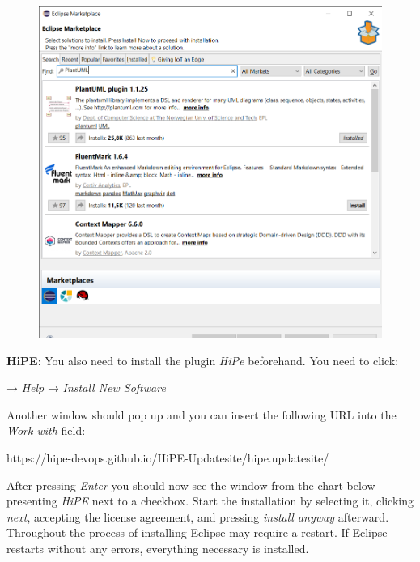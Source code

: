 \begin{figure}[h]
    \centering
    \includegraphics[scale = 0.4]{pictures/Eclipse Marketplace 08.11.2021 16_56_39.png}
    \label{screenshot marketplace}
    \caption{}
    
\end{figure}
\clearpage
\textbf{HiPE}: \newline\newline
You also need to install the plugin \textsf{\textit{HiPe}} beforehand. You need to click: \newline

\centering
→ \textsf{\textit{Help}} →
\textsf{\textit{Install New Software}}\newline

\raggedright
Another window should pop up and you can insert the following URL into the \textsf{\textit{Work with}} field:\newline


\centering
{\color{blue}https://hipe-devops.github.io/HiPE-Updatesite/hipe.updatesite/ \newline}

\raggedright
After pressing \textsf{\textit{Enter}} you should now see the window from the chart below presenting \textsf{\textit{HiPE}} next to a checkbox. Start the installation by selecting it, clicking \textsf{\textit{next}}, accepting the license agreement, and pressing \textsf{\textit{install anyway}} afterward. Throughout the process of installing Eclipse may require a restart. If Eclipse restarts without any errors, everything necessary is installed.\newline\newline

